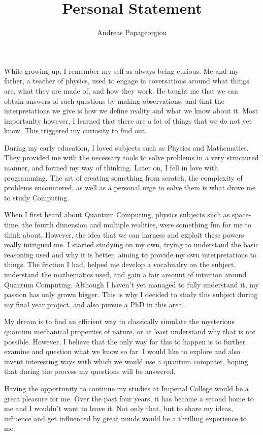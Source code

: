 \documentclass[a4paper,10pt]{article}
\title{Personal Statement}
\author{Andreas Papageorgiou}
\date{}
\begin{document}
\maketitle
\thispagestyle{empty}

\onehalfspacing

While growing up, I remember my self as always being curious. Me and my father, a teacher of physics, used to engage in coversations around
what things are, what they are made of, and how they work. He taught me that we can obtain answers of such
questions by making observations, and that the interpretations we give is how we define reality and what we know about it.
Most importanlty however, I learned that there are a lot of things that we do not yet know. This triggered my curiosity to find out.

During my early education, I loved subjects such as Physics and Mathematics. They provided me with the necessary tools
to solve problems in a very structured manner, and formed my way of thinking. Later on, I fell in love with programming.
The art of creating something from scratch, the complexity of problems encountered, as well as a personal urge to solve them
is what drove me to study Computing.

When I first heard about Quantum Computing, physics subjects such as space-time, the fourth dimension and multiple realities, were 
something fun for me to think about. However, the idea that we can harness and exploit these powers really intrigued me.
I started studying on my own, trying to understand the basic reasoning used and why it is better, aiming to provide my own
interpretations to things. The friction I had, helped me develop a vocabualry on the subject, understand the mathematics used,
and gain a fair amount of intuition around Quantum Computing. Although I haven't yet managed to fully understand it,
my passion has only grown bigger. This is why I decided to study this subject during my final year project, and also pursue a PhD in this area.

My dream is to find an efficient way to classically simulate the mysterious quantum mechanical properties of nature, or at least understand
why that is not possible. However, I believe that the only way for this to happen is to further examine and question what we know so far.
I would like to explore and also invent interesting ways with which we would use a quantum computer,
hoping that during the process my questions will be answered.

Having the opportunity to continue my studies  at Imperial College would be a great pleasure for me. Over the past four years, it has become
a second home to me and I wouldn't want to leave it. Not only that, but to share my ideas, influence and get influenced by great minds would be a thrilling
experience to me.
\end{document}
